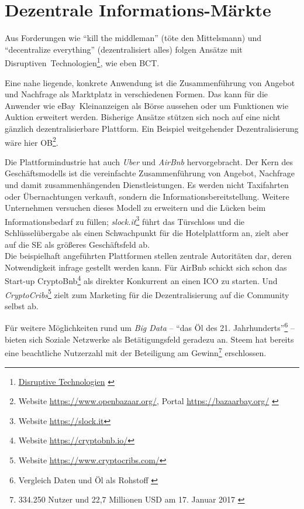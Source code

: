 
\section{Dezentrale Informations-Märkte}

Aus Forderungen wie \enquote{kill the middleman} (töte den Mittelsmann) und \enquote{decentralize everything} (dezentralisiert alles) folgen Ansätze mit \mbox{Disruptiven Technologien}\footnote{\href{http://wirtschaftslexikon.gabler.de/Definition/disruptive-technologien.html}{Disruptive Technologien} \autocite{w:lexika-econimics}}, wie eben \gls{BCT}.

Eine nahe liegende, konkrete Anwendung ist die Zusammenführung von Angebot und Nachfrage als Marktplatz in verschiedenen Formen. Das kann für die Anwender wie \mbox{eBay Kleinanzeigen} als Börse aussehen oder um Funktionen wie Auktion erweitert werden. Bisherige Ansätze stützen sich noch auf eine nicht gänzlich dezentralisierbare Plattform. Ein Beispiel weitgehender Dezentralisierung wäre hier \gls{OB}\footnote{Website \url{https://www.openbazaar.org/}, Portal \url{https://bazaarbay.org/} \autocite{w:openbazaar}}.

Die Plattformindustrie hat auch \emph{Uber} und \emph{AirBnb} hervorgebracht. Der Kern des Geschäftsmodells ist die vereinfachte Zusammenführung von Angebot, Nachfrage und damit zusammenhängenden Dienstleistungen. Es werden nicht Taxifahrten oder Übernachtungen verkauft, sondern die Informationsbereitstellung. Weitere Unternehmen versuchen dieses Modell zu erweitern und die Lücken beim Informationsbedarf zu füllen; \emph{slock.it}\footnote{Website \url{https://slock.it}} führt das Türschloss und die Schlüsselübergabe als einen Schwachpunkt für die Hotelplattform an, zielt aber auf die \gls{SE} als größeres Geschäftsfeld ab.\\
Die beispielhaft angeführten Plattformen stellen zentrale Autoritäten dar, deren Notwendigkeit infrage gestellt werden kann. Für AirBnb schickt sich schon das Start-up CryptoBnb\footnote{Website \url{https://cryptobnb.io/}} als direkter Konkurrent an einen \gls{ICO} zu starten. Und \emph{CryptoCribs}\footnote{Website \url{https://www.cryptocribs.com/}} zielt zum Marketing für die Dezentralisierung auf die Community selbst ab.

Für weitere Möglichkeiten rund um \emph{Big Data} %
 -- \enquote{das Öl des 21. Jahrhunderts}\footnote{Vergleich Daten und Öl als Rohstoff \autocite{b:spitz-daten}} -- bieten sich Soziale Netzwerke als Betätigungsfeld geradezu an. Steem hat bereits eine beachtliche Nutzerzahl mit der Beteiligung am Gewinn\footnote{334.250 Nutzer und 22,7 Millionen USD am 17. Januar 2017 \autocite{w:steem}} erschlossen. 

